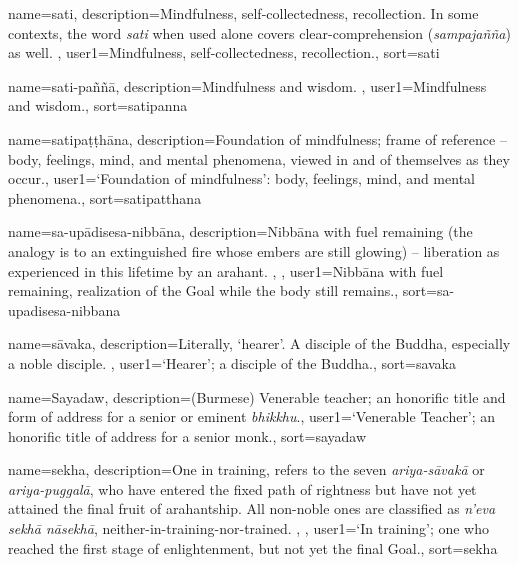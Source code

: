 {
name={sati},
description={Mindfulness, self-collectedness, recollection. In some contexts, the word \textit{sati} when used alone covers clear-comprehension (\textit{sampaja\~n\~na}) as well. \protect \seepre %
\protect {}%
\protect \seepost %
},
user1={Mindfulness, self-collectedness, recollection.},
sort={sati}
}

{
name=sati-pa\~n\~n\=a,
description={Mindfulness and wisdom. \protect \seepre %
\protect {}%
\protect \seepost %
},
user1={Mindfulness and wisdom.},
sort={satipanna}
}

{
name={satipa\d{t}\d{t}h\=ana},
description={Foundation of mindfulness; frame of reference -- body, feelings, mind, and mental phenomena, viewed in and of themselves as they occur.},
user1={`Foundation of mindfulness': body, feelings, mind, and mental phenomena.},
sort={satipatthana}
}

{
name={sa-up\=adisesa-nibb\=ana},
description={Nibb\=ana with fuel remaining (the analogy is to an extinguished fire whose embers are still glowing) -- liberation as experienced in this lifetime by an arahant. \protect \seepre %
\protect {}, \protect {}%
\protect \seepost %
},
user1={Nibb\=ana with fuel remaining, realization of the Goal while the body still remains.},
sort={sa-upadisesa-nibbana}
}

{
name={s\=avaka},
description={Literally, `hearer'. A disciple of the Buddha, especially a noble disciple. \protect \seepre %
\protect {}%
\protect \seepost %
},
user1={`Hearer'; a disciple of the Buddha.},
sort={savaka}
}

{
name={Sayadaw},
description={(Burmese) Venerable teacher; an honorific title and form of address for a senior or eminent \textit{bhikkhu}.},
user1={`Venerable Teacher'; an honorific title of address for a senior monk.},
sort={sayadaw}
}

{
name=sekha,
description={One in training, refers to the seven \textit{ariya-s\=avak\=a} or \textit{ariya-puggal\=a}, who have entered the fixed path of rightness but have not yet attained the final fruit of arahantship. All non-noble ones are classified as \textit{n'eva sekh\=a n\=asekh\=a}, neither-in-training-nor-trained. \protect \seepre %
\protect {}, \protect {}%
\protect \seepost %
},
user1={`In training'; one who reached the first stage of enlightenment, but not yet the final Goal.},
sort={sekha}
}

